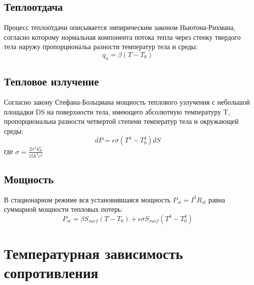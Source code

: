 \documentclass[a4paper,14pt]{extarticle}
\begin{document}
		\subsection{Теплоотдача}
			Процесс теплоотдачи описывается эмпирическим законом Ньютона-Рихмана, согласно которому нормальная компонента потока тепла через стенку твердого тела наружу пропорциональа разности температур тела и среды:
			\begin{equation}
				q_n = \beta (T - T_0)
			\end{equation}
		\subsection{Тепловое излучение}
			Согласно закону Стефана-Больцмана мощность теплового узлучения с небольшой площадки DS на поверхности тела, имеющего абсолютную температуру T, пропорциональна разности четвертой степени температур тела и окружающей среды:
			\begin{equation}
				dP = \epsilon \sigma (T^4 - T^4_0)dS
			\end{equation}
			где $\sigma = \frac{2 \pi^5 k^4_B}{15h^3c^2}$
		\subsection{Мощность}
			В стационарном режиме вся установившаяся мощность $P_{st} = I^2 R_{st}$ равна суммарной мощности тепловых потерь:
			\begin{equation}
				P_{st} = \beta S_{surf} (T - T_0) + \epsilon \sigma S_{surf} (T^4 - T^4_0)
			\end{equation}
	\section{Температурная зависимость сопротивления}
\end{document}
